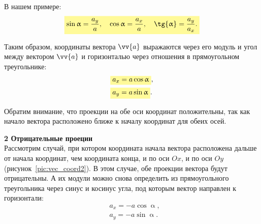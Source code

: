 В нашем примере:
\begin{align}
  \hly{\sin{\upalpha} = \dfrac{a_y}{a},\quad \cos{\upalpha} = \dfrac{a_x}{a},\quad \tg{\upalpha} = \dfrac{a_y}{a_x}.}
\end{align}

Таким образом, координаты вектора $\vv{a}$ выражаются через его модуль
и угол между вектором $\vv{a}$ и горизонталью через отношения в прямоугольном треугольнике:
\begin{align}
  &\hly{a_x = a\cos{\upalpha}},\\
  &\hly{a_y = a\sin{\upalpha}}.
\end{align}

Обратим внимание, что проекции на обе оси координат положительны, так как 
начало вектора расположено ближе к началу координат для обеих осей.

\clearpage

\textbf{2 Отрицательные проеции}\\
Рассмотрим случай, при котором координата начала вектора расположена
дальше от начала координат, чем координата конца,
и по оси $Ox$, и по оси $Oy$ (рисунок~\ref{pic:vec_coord2}).
В этом случае, обе проекции вектора будут отрицательны. А их модули можно
снова определить из прямоугольного треугольника через синус и косинус угла,
под которым вектор направлен к горизонтали:
\begin{align}
  &a_x = -a\cos{\upalpha},\\
  &a_y = -a\sin{\upalpha}.
\end{align}

